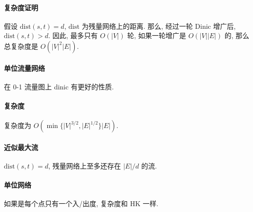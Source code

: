 \paragraph{复杂度证明} 假设 $\mathrm{dist} (s, t) = d$, $\mathrm{dist}$ 为残量网络上的距离.
那么, 经过一轮 Dinic 增广后, $\mathrm{dist} (s, t) > d$.
因此, 最多只有 $O(|V|)$ 轮, 如果一轮增广是 $O(|V||E|)$ 的,
那么总复杂度是 $O(|V|^2|E|)$.

\paragraph{单位流量网络}
在 0-1 流量图上 dinic 有更好的性质. 
\paragraph{复杂度} 复杂度为 $O(\min \{|V| ^ {3/2}, |E| ^ {1/2}\} |E|)$.
\paragraph{近似最大流} $\mathrm{dist} (s, t) = d$, 残量网络上至多还存在 $|E|/d$ 的流.
\paragraph{单位网络} 如果是每个点只有一个入/出度, 复杂度和 HK 一样.
